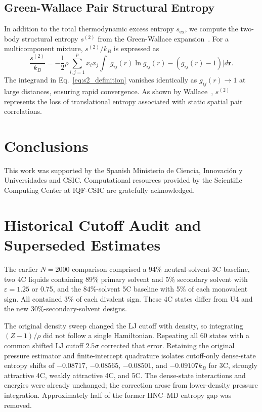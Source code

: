 \documentclass[aps,pre,twocolumn,superscriptaddress,floatfix]{revtex4-2}
\begin{document}
\subsection{Green-Wallace Pair Structural Entropy}

In addition to the total thermodynamic excess entropy $s_{\text{ex}}$, we compute the two-body structural entropy $s^{(2)}$ from the Green-Wallace expansion~\cite{Green1952,Wallace1987}. For a multicomponent mixture, $s^{(2)} / k_B$ is expressed as
\begin{equation}
\frac{s^{(2)}}{k_B} = -\frac{1}{2} \rho \sum_{i,j=1}^p x_i x_j \int \bigl[ g_{ij}(r) \ln g_{ij}(r) - (g_{ij}(r) - 1) \bigr] d\mathbf{r}.
\label{eq:s2_definition}
\end{equation}
The integrand in Eq.~\eqref{eq:s2_definition} vanishes identically as $g_{ij}(r) \to 1$ at large distances, ensuring rapid convergence. As shown by Wallace~\cite{Wallace1987}, $s^{(2)}$ represents the loss of translational entropy associated with static spatial pair correlations.





\section{Conclusions}


\begin{acknowledgments}
This work was supported by the Spanish Ministerio de Ciencia, Innovaci{\'o}n y Universidades and CSIC. Computational resources provided by the Scientific Computing Center at IQF-CSIC are gratefully acknowledged.
\end{acknowledgments}


\appendix
\section{Historical Cutoff Audit and Superseded Estimates}
\label{app:cutoff}

The earlier $N=2000$ comparison comprised a 94\% neutral-solvent 3C baseline, two 4C liquids containing 89\% primary solvent and 5\% secondary solvent with $\varepsilon=1.25$ or 0.75, and the 84\%-solvent 5C baseline with 5\% of each monovalent sign. All contained 3\% of each divalent sign. These 4C states differ from U4 and the new 30\%-secondary-solvent designs.

The original density sweep changed the LJ cutoff with density, so integrating $(Z-1)/\rho$ did not follow a single Hamiltonian. Repeating all 60 states with a common shifted LJ cutoff $2.5\sigma$ corrected that error. Retaining the original pressure estimator and finite-intercept quadrature isolates cutoff-only dense-state entropy shifts of $-0.08717$, $-0.08565$, $-0.08501$, and $-0.09107k_B$ for 3C, strongly attractive 4C, weakly attractive 4C, and 5C. The dense-state interactions and energies were already unchanged; the correction arose from lower-density pressure integration. Approximately half of the former HNC--MD entropy gap was removed.
\end{document}
